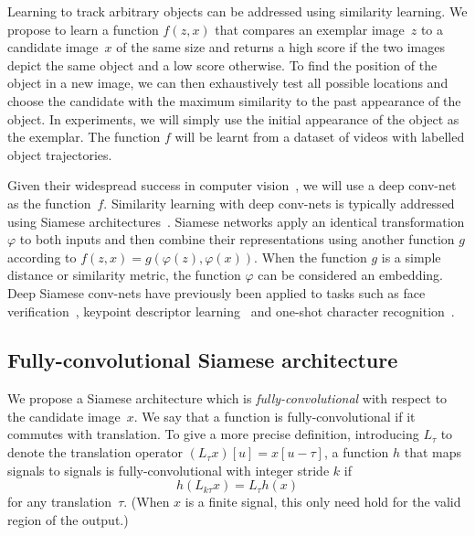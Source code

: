 Learning to track arbitrary objects can be addressed using similarity learning.
We propose to learn a function $f(z, x)$ that compares an exemplar image~$z$ to a candidate image~$x$ of the same size and returns a high score if the two images depict the same object and a low score otherwise.
To find the position of the object in a new image, we can then exhaustively test all possible locations and choose the candidate with the maximum similarity to the past appearance of the object.
In experiments, we will simply use the initial appearance of the object as the exemplar.
The function $f$ will be learnt from a dataset of videos with labelled object trajectories.

Given their widespread success in computer vision~\cite{razavian2014cnn,parkhi2015deep,dosovitskiy2015flownet,krizhevsky2012imagenet}, we will use a deep conv-net as the function~$f$.
Similarity learning with deep conv-nets is typically addressed using Siamese architectures~\cite{bromley1993signature,taigman2014deepface,zagoruyko2015learning}.
Siamese networks apply an identical transformation $\varphi$ to both inputs and then combine their representations using another function $g$ according to $f(z, x) = g(\varphi(z), \varphi(x))$.
When the function $g$ is a simple distance or similarity metric, the function $\varphi$ can be considered an embedding.
Deep Siamese conv-nets have previously been applied to tasks such as face verification~\cite{taigman2014deepface,schroff2015facenet,parkhi2015deep}, keypoint descriptor learning~\cite{zagoruyko2015learning,simo2015discriminative} and one-shot character recognition~\cite{koch2015siamese}.

\subsection{Fully-convolutional Siamese architecture}

We propose a Siamese architecture which is \emph{fully-convolutional} with respect to the candidate image~$x$.
We say that a function is fully-convolutional if it commutes with translation.
To give a more precise definition, introducing $L_{\tau}$ to denote the translation operator $(L_{\tau} x)[u] = x[u-\tau]$, a function $h$ that maps signals to signals is fully-convolutional with integer stride $k$ if
\begin{equation}\label{eq:commutes-translation}
h(L_{k \tau} x) = L_{\tau} h(x)
\end{equation}
for any translation~$\tau$.
(When $x$ is a finite signal, this only need hold for the valid region of the output.)

